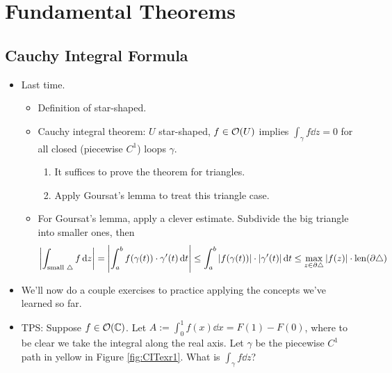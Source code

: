 \documentclass[../notes.tex]{subfiles}
\begin{document}
\chapter{Fundamental Theorems}
\section{Cauchy Integral Formula}
\begin{itemize}
    \item {}Last time.
    \begin{itemize}
        \item Definition of star-shaped.
        \item Cauchy integral theorem: $U$ star-shaped, $f\in\mathcal{O}(U)$ implies $\int_\gamma f\dd{z}=0$ for all closed (piecewise $C^1$) loops $\gamma$.
        \begin{enumerate}
            \item It suffices to prove the theorem for triangles.
            \item Apply Goursat's lemma to treat this triangle case.
        \end{enumerate}
        \item For Goursat's lemma, apply a clever estimate. Subdivide the big triangle into smaller ones, then
        \begin{align*}
            \left| \int_{\text{small }\triangle} f\dd{z} \right| = \left| \int_a^bf(\gamma(t))\cdot\gamma'(t)\dd{t} \right|
            \leq \int_a^b|f(\gamma(t))|\cdot|\gamma'(t)|\dd{t}
            \leq \max_{z\in\partial\triangle}|f(z)|\cdot\operatorname{len}(\partial\triangle)
        \end{align*}
    \end{itemize}
    \item We'll now do a couple exercises to practice applying the concepts we've learned so far.
    \item TPS: Suppose $f\in\mathcal{O}(\mathbb{C})$. Let $A:=\int_0^1f(x)\dd{x}=F(1)-F(0)$, where to be clear we take the integral along the real axis. Let $\gamma$ be the piecewise $C^1$ path in yellow in Figure \ref{fig:CITexr1}. What is $\int_\gamma f\dd{z}$?
    \begin{figure}[h!]
        \centering
\end{figure}
\end{itemize}
\end{document}
